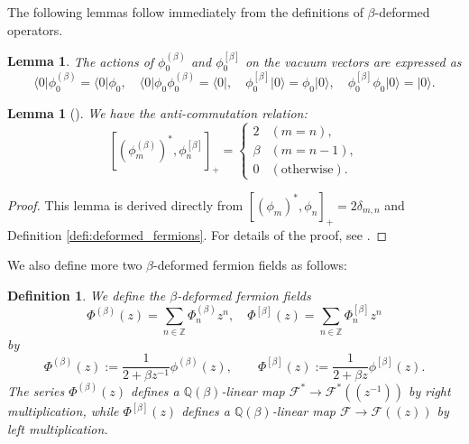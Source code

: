\documentclass{amsart}
\newtheorem{lemma}[thm]{Lemma}
\newtheorem{defi}[thm]{Definition}
\def\QQ{\mathord{\mathbb{Q}}}
\def\ZZ{\mathord{\mathbb{Z}}}
\def\ket#1{\vert #1 \rangle}
\def\bra#1{\langle #1 \vert}
\begin{document}
The following lemmas follow immediately from the definitions of $\beta$-deformed operators.
\begin{lemma}
The actions of $\phi_0^{(\beta)}$ and $\phi_0^{[\beta]}$ on the vacuum vectors are expressed as
\begin{equation}\label{eq:vs_phi_0}
\bra{0}\phi_0^{(\beta)}=\bra{0}\phi_0,\quad
\bra{0}\phi_0\phi_0^{(\beta)}=\bra{0},\quad
\phi_0^{[\beta]}\ket{0}=\phi_0\ket{0},\quad
\phi_0^{[\beta]}\phi_0\ket{0}=\ket{0}.
\end{equation}
\end{lemma}



\begin{lemma}[{\cite[\S 9.1]{iwao2021neutralfermionic}}]
\label{lemma:basic_anti_commutation}
We have the anti-commutation relation:
\[
[(\phi^{(\beta)}_m)^\ast, \phi^{[\beta]}_n]_+
=
\begin{cases}
2 & (m=n),\\
\beta & (m=n-1),\\
0 & (\mbox{otherwise}).
\end{cases}
\]
\end{lemma}
\begin{proof}
This lemma is derived directly from $[(\phi_m)^\ast,\phi_n]_+=2\delta_{m,n}$ and Definition \ref{defi:deformed_fermions}.
For details of the proof, see \cite[\S 9.1]{iwao2021neutralfermionic}.
\end{proof}


We also define more two $\beta$-deformed fermion fields as follows:
\begin{defi}\label{def:Phi}
We define the $\beta$-deformed fermion fields
\[
\Phi^{(\beta)}(z)=\sum_{n\in \ZZ}\Phi_n^{(\beta)}z^n,
\quad
\Phi^{[\beta]}(z)=\sum_{n\in \ZZ}\Phi_n^{[\beta]}z^n
\]
by
\[
\Phi^{(\beta)}(z):=\frac{1}{2+\beta z^{-1}}\phi^{(\beta)}(z),\qquad
\Phi^{[\beta]}(z):=\frac{1}{2+\beta z}\phi^{[\beta]}(z).
\]
The series $\Phi^{(\beta)}(z)$ defines a $\QQ(\beta)$-linear map $\mathcal{F}^\ast \to \mathcal{F}^\ast((z^{-1}))$ by right multiplication,  
while $\Phi^{[\beta]}(z)$ defines a $\QQ(\beta)$-linear map $\mathcal{F} \to \mathcal{F}((z))$ by left multiplication.
%
%
\end{defi}
\end{document}
